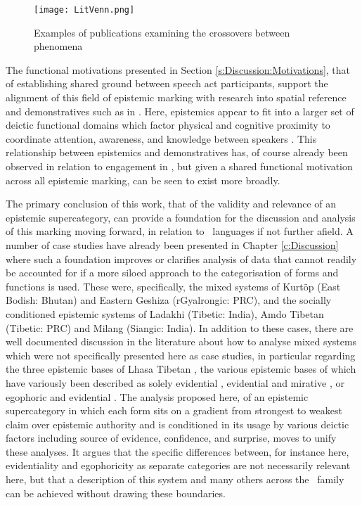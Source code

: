 \begin{figure}
    \centering
    \texttt{[image: LitVenn.png]}
    \caption{Examples of publications examining the crossovers between phenomena}
    \label{f:Conclusion:LitVenn}
\end{figure}

The functional motivations presented in Section \ref{s:Discussion:Motivations}, that of establishing shared ground between speech act participants, support the alignment of this field of epistemic marking with research into spatial reference and demonstratives such as in . Here, epistemics appear to fit into a larger set of deictic functional domains which factor physical and cognitive proximity to coordinate attention, awareness, and knowledge between speakers \cite{Peeters2016}. This relationship between epistemics and demonstratives has, of course already been observed in relation to engagement in , but given a shared functional motivation across all epistemic marking, can be seen to exist more broadly.

The primary conclusion of this work, that of the validity and relevance of an epistemic supercategory, can provide a foundation for the discussion and analysis of this marking moving forward, in relation to \lfam\ languages if not further afield. A number of case studies have already been presented in Chapter \ref{c:Discussion} where such a foundation improves or clarifies analysis of data that cannot readily be accounted for if a more siloed approach to the categorisation of forms and functions is used. These were, specifically, the mixed systems of Kurtöp (East Bodish: Bhutan) and Eastern Geshiza (rGyalrongic: PRC), and the socially conditioned epistemic systems of Ladakhi (Tibetic: India), Amdo Tibetan (Tibetic: PRC) and Milang (Siangic: India). In addition to these cases, there are well documented discussion in the literature about how to analyse mixed systems which were not specifically presented here as case studies, in particular regarding the three epistemic bases of Lhasa Tibetan \cite{DeLancey2017Tibetan}, the various epistemic bases of which have variously been described as solely evidential \cite{Gawne2017}, evidential and mirative \cites{DeLanceyMirativity1997}{DeLancey2012}, or egophoric and evidential \cites{Tournadre1992}{Widmer2017}. The analysis proposed here, of an epistemic supercategory in which each form sits on a gradient from strongest to weakest claim over epistemic authority and is conditioned in its usage by various deictic factors including source of evidence, confidence, and surprise, moves to unify these analyses. It argues that the specific differences between, for instance here, evidentiality and egophoricity as separate categories are not necessarily relevant here, but that a description of this system and many others across the \lfam\ family can be achieved without drawing these boundaries.

